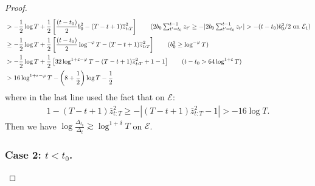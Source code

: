 \begin{proof}
\begin{align*}
    &> -\frac{1}{2} \log T + \frac{1}{2} \left[\frac{(t-t_0)}{2}b_0^2 - (T-t+1)\overline{z}^2_{t:T}\right] \tag{$2b_0\sum_{t'=t_0}^{t-1}z_{t'} \geq - |2b_0\sum_{t'=t_0}^{t-1}z_{t'}| > - (t-t_0)b_0^2/ 2$ on $\mathcal{E}_1$} \\
    &\geq -\frac{1}{2} \log T + \frac{1}{2} \left[\frac{(t-t_0)}{2}\log^{-\varphi}T - (T-t+1)\overline{z}^2_{t:T}\right] \tag{$b_0^2 \geq \log^{-\varphi}T$} \\
    &> -\frac{1}{2} \log T + \frac{1}{2} \left[32\log^{1+\varepsilon- \varphi}T - (T-t+1)\overline{z}^2_{t:T} + 1 - 1\right] \tag{$t-t_0 > 64 \log^{1+\varepsilon}T$} \\
    &> 16\log^{1+\varepsilon-\varphi}T - \left(8 + \frac{1}{2}\right) \log T - \frac{1}{2}
\end{align*}
where in the last line used the fact that on $\mathcal{E}$:
\begin{align*}
    1-(T-t+1)\overline{z}^2_{t:T} \geq - | (T-t+1)\overline{z}^2_{t:T} - 1| > -16\log T.
\end{align*}
Then we have $\log \frac{\Delta_{t_0}}{\Delta_t} \gtrsim \log^{1+\delta} T$ on $\mathcal{E}$.

\subsubsection*{Case 2: $t < t_0$.}


\end{proof}
